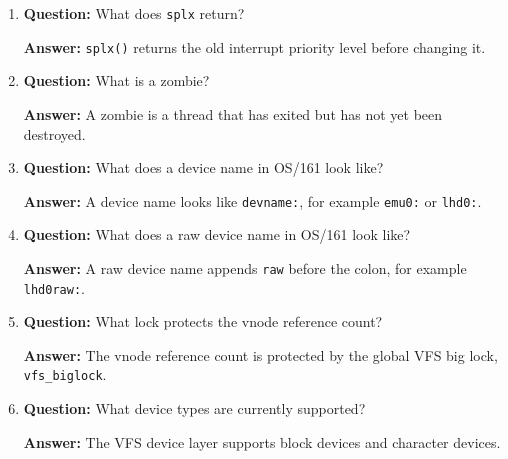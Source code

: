 \documentclass[11pt,a4paper]{article}
\begin{document}
\begin{enumerate}
    \item \textbf{Question:} What does \texttt{splx} return?

    \textbf{Answer:} \texttt{splx()} returns the old interrupt priority level before changing it.

    \item \textbf{Question:} What is a zombie?

    \textbf{Answer:} A zombie is a thread that has exited but has not yet been destroyed.

    \item \textbf{Question:} What does a device name in OS/161 look like?

    \textbf{Answer:} A device name looks like \texttt{devname:}, for example \texttt{emu0:} or \texttt{lhd0:}.

    \item \textbf{Question:} What does a raw device name in OS/161 look like?

    \textbf{Answer:} A raw device name appends \texttt{raw} before the colon, for example \texttt{lhd0raw:}.

    \item \textbf{Question:} What lock protects the vnode reference count?

    \textbf{Answer:} The vnode reference count is protected by the global VFS big lock, \texttt{vfs\_biglock}.

    \item \textbf{Question:} What device types are currently supported?

    \textbf{Answer:} The VFS device layer supports block devices and character devices.
\end{enumerate}
\end{document}
